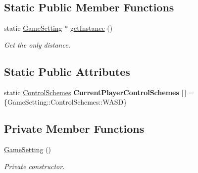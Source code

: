 \subsection*{Static Public Member Functions}
\begin{DoxyCompactItemize}
\item 
\mbox{\label{class_game_setting_a707afc9993cd522cd5088f8f8c0cc247}} 
static \mbox{\hyperlink{class_game_setting}{Game\+Setting}} $\ast$ \mbox{\hyperlink{class_game_setting_a707afc9993cd522cd5088f8f8c0cc247}{get\+Instance}} ()
\begin{DoxyCompactList}\small\item\em Get the only distance. \end{DoxyCompactList}\end{DoxyCompactItemize}
\subsection*{Static Public Attributes}
\begin{DoxyCompactItemize}
\item 
\mbox{\label{class_game_setting_af557e21ed3d24d7b998eb94b46ff0824}} 
static \mbox{\hyperlink{class_game_setting_aeff0cf4cbeffbd2a48db8ac3a06de9f4}{Control\+Schemes}} {\bfseries Current\+Player\+Control\+Schemes} \mbox{[}$\,$\mbox{]} = \{Game\+Setting\+::\+Control\+Schemes\+::\+W\+A\+SD\}
\end{DoxyCompactItemize}
\subsection*{Private Member Functions}
\begin{DoxyCompactItemize}
\item 
\mbox{\label{class_game_setting_a22ee8fee187c803731eafe6c36d2ed75}} 
\mbox{\hyperlink{class_game_setting_a22ee8fee187c803731eafe6c36d2ed75}{Game\+Setting}} ()
\begin{DoxyCompactList}\small\item\em Private constructor. \end{DoxyCompactList}\end{DoxyCompactItemize}
